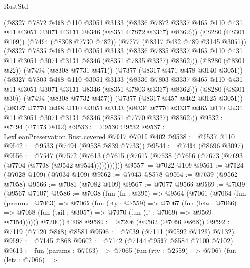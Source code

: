 \begin{lexlean}{RustStd}
\begin{coremodule}
            (@8327
              @7872
              @468
              @110
              @3051
              @3133
              (@8336
                @7872
                @3337
                @465
                @110
                @431
                @11
                @3051
                @3071
                @3131
                @8346
                (@8351 @7872 @3337)
                @8362)))
          (@8280 (@8301 @109))
          (@7494 (@8308 @7730 @482))
          (@7377 (@8317 @482 @489 @3145 @3051))
          (@8327
            @7835
            @468
            @110
            @3051
            @3133
            (@8336
              @7835
              @3337
              @465
              @110
              @431
              @11
              @3051
              @3071
              @3131
              @8346
              (@8351 @7835 @3337)
              @8362)))
        (@8280 (@8301 @22))
        (@7494 (@8308 @7731 @471))
        (@7377 (@8317 @471 @478 @3140 @3051))
        (@8327
          @7803
          @468
          @110
          @3051
          @3133
          (@8336 @7803 @3337 @465 @110 @431 @11 @3051 @3071 @3131 @8346 (@8351 @7803 @3337) @8362)))
      (@8280 (@8301 @30))
      (@7494 (@8308 @7732 @457))
      (@7377 (@8317 @457 @462 @3125 @3051))
      (@8327
        @7770
        @468
        @110
        @3051
        @3133
        (@8336 @7770 @3337 @465 @110 @431 @11 @3051 @3071 @3131 @8346 (@8351 @7770 @3337) @8362)))
@9532 := @7494 (@7173 @402)
@9533 := @9530 @9532
@9537 := LexLeanPreservation.Rust.covered @7017 @7019 @402
@9538 := @9537 @110
@9542 := @9533 (@7494 (@9538 @839 @7733))
@9544 := @7494 (@8696 @3097)
@9556 := @7547
    (@7572 (@7613 (@7615 (@7617 (@7638 (@7656 (@7673 (@7693 (@7704 (@7708 (@9542 @9544)))))))))))
@9557 := @7022 @109
@9561 := @7024 (@7028 @109) (@7034 @109)
@9562 := @7043 @8578
@9564 := @7039 (@9562 @7058)
@9566 := @7081 (@7082 @109)
@9567 := @7077 @9566
@9569 := @7039 (@9567 @7107)
@9586 := @7038
    (fun (fn : @395) =>
    @9564
      (@7061
        (@7064
          (fun (params : @7063) =>
          @7065
            (fun (rty : @2559) =>
            @7067
              (fun (lets : @7066) =>
              @7068 (fun (tail : @3057) => @7070 (fun (Γ : @7069) => @9569 @7154))))))
        @7200))
    @868
@9589 := @7206 (@9562 (@7056 @868))
@9592 := @7119 (@7120 @868) @8581
@9596 := @7039 (@7111 (@9592 @7128) @7132)
@9597 := @7145 @868
@9602 := @7142 (@7144 @9597 @8584 @7100 @7102)
@9613 := fun (params : @7063) =>
  @7065
    (fun (rty : @2559) =>
    @7067
      (fun (lets : @7066) =>

\end{coremodule}
\end{lexlean}
